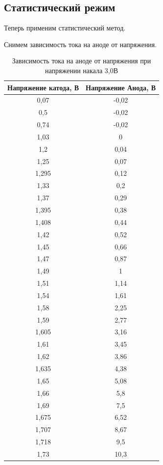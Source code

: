 \documentclass[a4paper,14pt]{extarticle}
\begin{document}
	\subsection{Статистический режим} %
	\label{sub:статистический_режим}
	
	Теперь применим статистический метод.

	Снимем зависимость тока на аноде от напряжения.
	\begin{table}[h!]
		\centering
		\caption{Зависимость тока на аноде от напряжения при напряжении накала 3,0В}
		\begin{tabular}{|c|c|} 
		\hline
		Напряжение катода, В&Напряжение Анода, В  \\ \hline
			0,07	&	-0,02	\\ \hline
0,5	&	-0,02	\\ \hline
0,74	&	-0,02	\\ \hline
1,03	&	0	\\ \hline
1,2	&	0,04	\\ \hline
1,25	&	0,07	\\ \hline
1,295	&	0,12	\\ \hline
1,33	&	0,2	\\ \hline
1,37	&	0,29	\\ \hline
1,395	&	0,38	\\ \hline
1,408	&	0,44	\\ \hline
1,42	&	0,52	\\ \hline
1,45	&	0,66	\\ \hline
1,47	&	0,87	\\ \hline
1,49	&	1	\\ \hline
1,51	&	1,14	\\ \hline
1,54	&	1,61	\\ \hline
1,58	&	2,25	\\ \hline
1,59	&	2,77	\\ \hline
1,605	&	3,16	\\ \hline
1,61	&	3,45	\\ \hline
1,62	&	3,86	\\ \hline
1,635	&	4,38	\\ \hline
1,65	&	5,08	\\ \hline
1,66	&	5,8	\\ \hline
1,69	&	7,5	\\ \hline
1,675	&	6,52	\\ \hline
1,707	&	8,67	\\ \hline
1,718	&	9,5	\\ \hline
1,73	&	10,3	\\ \hline

\end{tabular}
\end{table}
\end{document}

